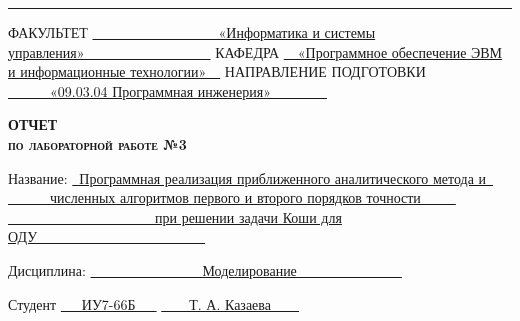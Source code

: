 \begin{titlepage}
	\noindent\rule{18cm}{1.5pt}
	
	\vspace{8mm}
	
	\noindent\textnormal{ФАКУЛЬТЕТ}\hspace{5mm} \underline{\textnormal{~~~~~~~~~~~~~~~~~~«Информатика и системы управления»~~~~~~~~~~~~~~~~~~}} \newline\newline
	\textnormal{КАФЕДРА}\hspace{5mm} \underline{\textnormal{~~«Программное обеспечение ЭВМ и информационные технологии»~~}}
	\newline\newline
	\textnormal{НАПРАВЛЕНИЕ ПОДГОТОВКИ}\hspace{5mm} \underline{\textnormal{~~~~~~«09.03.04 Программная инженерия»~~~~~~~~}}
	
	\vspace{2.5cm}
	
	\begin{center}
		\Large\textbf{\textsc{ОТЧЕТ}}\\
		\Large\textbf{\textsc{по лабораторной работе №3}}\\
	\end{center}
	
	\vspace{1cm}
	
	\noindent\textnormal{Название:} \hspace{15mm} \underline{\textnormal{~Программная реализация приближенного аналитического метода и~}}\noindent \\
	\noindent\hphantom{Название:} \hspace{15mm} \underline{\textnormal{~~~~~~численных алгоритмов первого и второго порядков точности~~~~~}}\noindent \\
	\noindent\hphantom{Название:} \hspace{15mm} \underline{\textnormal{~~~~~~~~~~~~~~~~~~~~~при решении задачи Коши для ОДУ~~~~~~~~~~~~~~~~~~~~~~~~}}\noindent
	
	\vspace{1.3cm}
	
	\noindent\textnormal{Дисциплина:} \hspace{10mm} \underline{\textnormal{~~~~~~~~~~~~~~~~Моделирование~~~~~~~~~~~~~~~}}\noindent
	
	\vspace{2cm}
	
	\noindent\textnormal{Студент} \hspace{17mm}
	\underline{\textnormal{{~~~ИУ7-66Б~~~}}}
	\hspace{20mm}
	\underline{\textnormal{\hphantom{\hspace{40mm}}}} \hspace{15mm}
	\underline{\textnormal{~~~~Т. А. Казаева~~~~}}
	

\end{titlepage}
